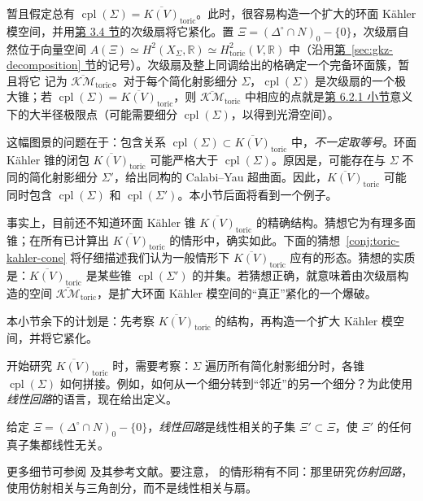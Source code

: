 暂且假定总有 $\operatorname{cpl}(\Sigma)=\overline{K(V)}_{\mathrm{toric}}$。此时，很容易构造一个扩大的环面 Kähler 模空间，并用\hyperref[sec:gkz-decomposition]{第 3.4 节}的次级扇将它紧化。置 $\Xi=(\Delta^\circ\cap N)_0-\{0\}$，次级扇自然位于向量空间
$A(\Xi)\simeq H^2(X_\Sigma,\mathbb R)\simeq H_{\mathrm{toric}}^2(V,\mathbb R)$ 中（沿用\hyperref[sec:gkz-decomposition]{第~\ref*{sec:gkz-decomposition} 节}的记号）。次级扇及整上同调给出的格确定一个完备环面簇，暂且将它
记为 $\overline{\mathcal{KM}}_{\mathrm{toric}}$。对于每个简化射影细分 $\Sigma$，$\operatorname{cpl}(\Sigma)$ 是次级扇的一个极大锥；若 $\operatorname{cpl}(\Sigma)=\overline{K(V)}_{\mathrm{toric}}$，则 $\overline{\mathcal{KM}}_{\mathrm{toric}}$ 中相应的点就是\hyperref[subsec:large-radius-limits]{第 6.2.1 小节}意义下的大半径极限点（可能需要细分 $\operatorname{cpl}(\Sigma)$，以得到光滑空间）。

这幅图景的问题在于：包含关系 $\operatorname{cpl}(\Sigma)\subset\overline{K(V)}_{\mathrm{toric}}$ 中，\emph{不一定取等号}。环面 Kähler 锥的闭包 $\overline{K(V)}_{\mathrm{toric}}$ 可能严格大于 $\operatorname{cpl}(\Sigma)$。原因是，可能存在与 $\Sigma$ 不同的简化射影细分 $\Sigma'$，给出同构的 Calabi--Yau 超曲面。因此，$\overline{K(V)}_{\mathrm{toric}}$ 可能同时包含 $\operatorname{cpl}(\Sigma)$ 和 $\operatorname{cpl}(\Sigma')$。本小节后面将看到一个例子。

事实上，目前还不知道环面 Kähler 锥 $\overline{K(V)}_{\mathrm{toric}}$ 的精确结构。猜想它为有理多面锥；在所有已计算出 $\overline{K(V)}_{\mathrm{toric}}$ 的情形中，确实如此。下面的猜想~\ref{conj:toric-kahler-cone} 将仔细描述我们认为一般情形下 $\overline{K(V)}_{\mathrm{toric}}$ 应有的形态。猜想的实质是：$\overline{K(V)}_{\mathrm{toric}}$ 是某些锥 $\operatorname{cpl}(\Sigma')$ 的并集。若猜想正确，就意味着由次级扇构造的空间 $\overline{\mathcal{KM}}_{\mathrm{toric}}$，是扩大环面 Kähler 模空间的“真正”紧化的一个爆破。

本小节余下的计划是：先考察 $\overline{K(V)}_{\mathrm{toric}}$ 的结构，再构造一个扩大 Kähler 模空间，并将它紧化。

开始研究 $\overline{K(V)}_{\mathrm{toric}}$ 时，需要考察：$\Sigma$ 遍历所有简化射影细分时，各锥 $\operatorname{cpl}(\Sigma)$ 如何拼接。例如，如何从一个细分转到“邻近”的另一个细分？为此使用\emph{线性回路}的语言，现在给出定义。
\begin{definition}\label{def:linear-circuit}
给定 $\Xi=(\Delta^\circ\cap N)_0-\{0\}$，\emph{线性回路}是线性相关的子集 $\Xi'\subset\Xi$，使 $\Xi'$ 的任何真子集都线性无关。
\end{definition}
更多细节可参阅  及其参考文献。要注意， 的情形稍有不同：那里研究\emph{仿射回路}，使用仿射相关与三角剖分，而不是线性相关与扇。

